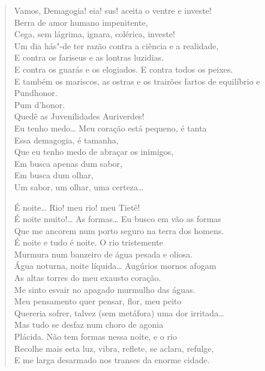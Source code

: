 \begin{verse}
Vamos, Demagogia! eia! sus! aceita o ventre e investe!\\
Berra de amor humano impenitente,\\
Cega, sem lágrima, ignara, colérica, investe!\\
Um dia hás"-de ter razão contra a ciência e a realidade,\\
E contra os fariseus e as lontras luzidias.\\
E contra os guarás e os elogiados. E contra todos os peixes.\\
E também os mariscos, as ostras e os trairões fartos de equilíbrio e\\
Pundhonor.\\
\quad\quad\quad\quad{}Pum d'honor.\\
\hfill{}Quedê as Juvenilidades Auriverdes!\\
Eu tenho medo\ldots{} Meu coração está pequeno, é tanta\\
Essa demagogia, é tamanha,\\
Que eu tenho medo de abraçar os inimigos,\\
Em busca apenas dum sabor,\\
Em busca dum olhar,\\
Um sabor, um olhar, uma certeza\ldots{}

É noite\ldots{} Rio! meu rio! meu Tietê!\\
É noite muito!\ldots{} As formas\ldots{} Eu busco em vão as formas\\
Que me ancorem num porto seguro na terra dos homens.\\
É noite e tudo é noite. O rio tristemente\\
Murmura num banzeiro de água pesada e oliosa.\\
Água noturna, noite líquida\ldots{} Augúrios mornos afogam\\
As altas torres do meu exausto coração.\\
Me sinto esvair no apagado murmulho das águas.\\
Meu pensamento quer pensar, flor, meu peito\\
Quereria sofrer, talvez (sem metáfora) uma dor irritada\ldots{}\\
Mas tudo se desfaz num choro de agonia\\
Plácida. Não tem formas nessa noite, e o rio\\
Recolhe mais esta luz, vibra, reflete, se aclara, refulge,\\
E me larga desarmado nos transes da enorme cidade.


\end{verse}
